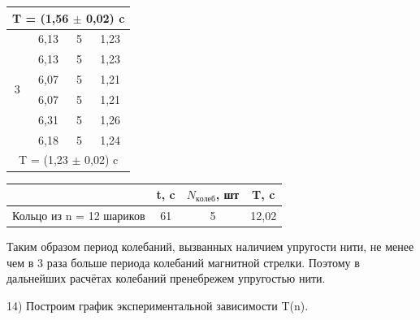 \documentclass[a4paper,12pt]{article}
\begin{document}
\begin{center}
\begin{tabular}{|c|c|c|c|}
     \hline
     \multicolumn{4}{|c|}{T = (1,56 $\pm$ 0,02) c} \\
     \hline
     \multirow{6}{*}{3} & 6,13 & 5 & 1,23 \\
     \cline{2-4} & 6,13 & 5 & 1,23 \\
     \cline{2-4} & 6,07 & 5 & 1,21 \\
     \cline{2-4} & 6,07 & 5 & 1,21 \\
     \cline{2-4} & 6,31 & 5 & 1,26 \\
     \cline{2-4} & 6,18 & 5 & 1,24 \\
     \hline
     \multicolumn{4}{|c|}{T = (1,23 $\pm$ 0,02) c} \\
     \hline
\end{tabular}
\end{center}

\begin{center}
\begin{tabular}{|c|c|c|c|}
	\hline
	& t, c & $N_{колеб}$, шт & T, c \\
	\hline
	Кольцо из n = 12 шариков & 61 & 5 & 12,02 \\
	\hline
\end{tabular}
\end{center}

Таким образом период колебаний, вызванных наличием упругости нити, не менее чем в 3 раза больше периода колебаний магнитной стрелки. Поэтому в дальнейших расчётах колебаний пренебрежем упругостью нити.
 
14) Построим график экспериментальной зависимости T(n).

\end{document}
